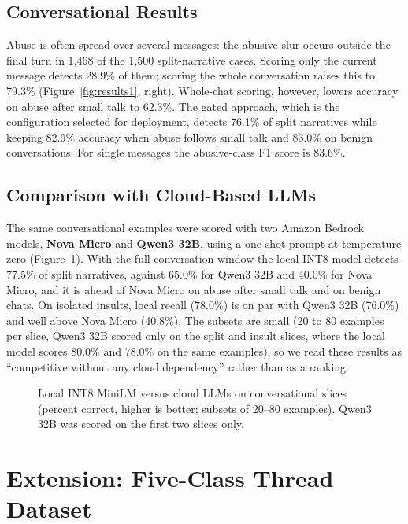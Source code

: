 \documentclass[sigconf,9pt]{acmart}
\begin{document}
\subsection{Conversational Results}
Abuse is often spread over several messages: the abusive slur occurs outside the final turn in 1{,}468 of the 1{,}500 split-narrative cases. Scoring only the current message detects 28.9\% of them; scoring the whole conversation raises this to 79.3\% (Figure~\ref{fig:results1}, right). Whole-chat scoring, however, lowers accuracy on abuse after small talk to 62.3\%. The gated approach, which is the configuration selected for deployment, detects 76.1\% of split narratives while keeping 82.9\% accuracy when abuse follows small talk and 83.0\% on benign conversations. For single messages the abusive-class F1 score is 83.6\%.

\subsection{Comparison with Cloud-Based LLMs}
The same conversational examples were scored with two Amazon Bedrock models, \textbf{Nova Micro} and \textbf{Qwen3 32B}, using a one-shot prompt at temperature zero (Figure~\ref{fig:bedrock}). With the full conversation window the local INT8 model detects 77.5\% of split narratives, against 65.0\% for Qwen3 32B and 40.0\% for Nova Micro, and it is ahead of Nova Micro on abuse after small talk and on benign chats. On isolated insults, local recall (78.0\%) is on par with Qwen3 32B (76.0\%) and well above Nova Micro (40.8\%). The subsets are small (20 to 80 examples per slice, Qwen3 32B scored only on the split and insult slices, where the local model scores 80.0\% and 78.0\% on the same examples), so we read these results as ``competitive without any cloud dependency'' rather than as a ranking.

\begin{figure}[h!]
  \centering
  \resizebox{\columnwidth}{!}{}
  \caption{Local INT8 MiniLM versus cloud LLMs on conversational slices (percent correct, higher is better; subsets of 20--80 examples). Qwen3 32B was scored on the first two slices only.}
  \label{fig:bedrock}
\end{figure}

\section{Extension: Five-Class Thread Dataset}\label{sec:data}
\end{document}
